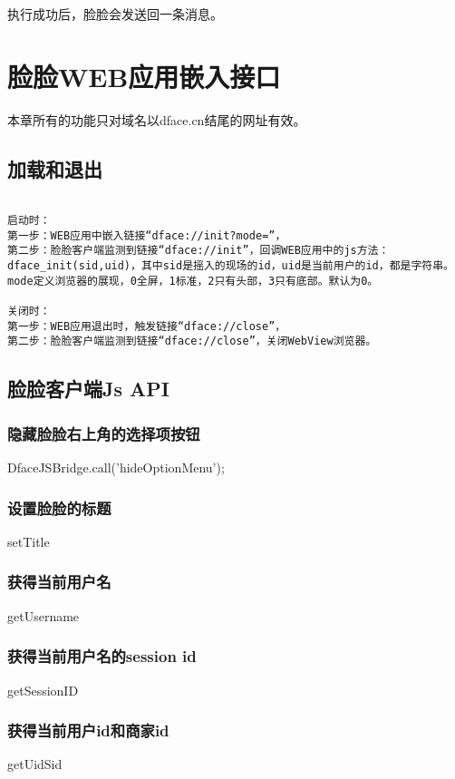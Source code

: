 \documentclass[cs4size]{ctexartutf8}
\begin{document}
执行成功后，脸脸会发送回一条消息。

\section{脸脸WEB应用嵌入接口}

本章所有的功能只对域名以dface.cn结尾的网址有效。

\subsection{加载和退出}

\begin{verbatim}

启动时：
第一步：WEB应用中嵌入链接“dface://init?mode=”，
第二步：脸脸客户端监测到链接“dface://init”，回调WEB应用中的js方法：dface_init(sid,uid)，其中sid是摇入的现场的id，uid是当前用户的id，都是字符串。mode定义浏览器的展现，0全屏，1标准，2只有头部，3只有底部。默认为0。

关闭时：
第一步：WEB应用退出时，触发链接“dface://close”，
第二步：脸脸客户端监测到链接“dface://close”，关闭WebView浏览器。
\end{verbatim}

\subsection{脸脸客户端Js API}

\subsubsection{隐藏脸脸右上角的选择项按钮}
DfaceJSBridge.call('hideOptionMenu');

\subsubsection{设置脸脸的标题}
setTitle

\subsubsection{获得当前用户名}
getUsername

\subsubsection{获得当前用户名的session id}
getSessionID

\subsubsection{获得当前用户id和商家id}
getUidSid
\end{document}
